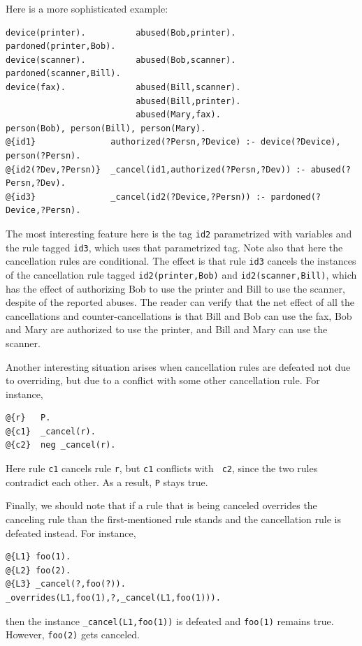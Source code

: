 \documentclass[11pt]{article}
\begin{document}
Here is a more sophisticated example:
\begin{verbatim}
device(printer).          abused(Bob,printer).       pardoned(printer,Bob).
device(scanner).          abused(Bob,scanner).       pardoned(scanner,Bill).
device(fax).              abused(Bill,scanner).
                          abused(Bill,printer).
                          abused(Mary,fax).
person(Bob), person(Bill), person(Mary).
@{id1}               authorized(?Persn,?Device) :- device(?Device), person(?Persn).
@{id2(?Dev,?Persn)}  _cancel(id1,authorized(?Persn,?Dev)) :- abused(?Persn,?Dev).
@{id3}               _cancel(id2(?Device,?Persn)) :- pardoned(?Device,?Persn).
\end{verbatim}
The most interesting feature here is the tag {\tt id2} parametrized with
variables and the rule tagged {\tt id3}, which uses that parametrized
tag. Note also that here the cancellation rules are conditional.
The effect is that rule {\tt id3} cancels the instances 
of the cancellation rule tagged {\tt id2(printer,Bob)} and
{\tt id2(scanner,Bill)}, which has the effect of authorizing Bob to use the
printer and Bill to use the scanner, despite of the reported abuses.  
The reader can verify that the net effect of all the cancellations and
counter-cancellations is that Bill and Bob can use the fax, Bob and Mary
are authorized to use the printer, and Bill and Mary can use the scanner.

Another interesting situation arises when cancellation rules are defeated
not due to overriding, but due to a conflict with some other cancellation
rule. For instance,
\begin{verbatim}
@{r}   P.
@{c1}  _cancel(r).
@{c2}  neg _cancel(r).
\end{verbatim}
Here rule {\tt c1} cancels rule {\tt r}, but {\tt c1} conflicts with {\tt
  c2}, since the two rules contradict each other. As a result, {\tt P}      
stays true.

Finally, we should note that if a rule that is being canceled overrides
the canceling rule than the first-mentioned rule stands and the
cancellation rule is defeated instead. For instance,
\begin{verbatim}
@{L1} foo(1).
@{L2} foo(2).
@{L3} _cancel(?,foo(?)).  
_overrides(L1,foo(1),?,_cancel(L1,foo(1))).
\end{verbatim}
then the instance {\tt \_cancel(L1,foo(1))} is defeated and {\tt foo(1)}
remains true. However, {\tt foo(2)} gets canceled.
\end{document}
